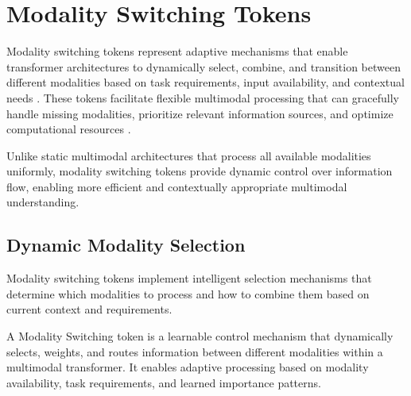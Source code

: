 
\section{Modality Switching Tokens}

Modality switching tokens represent adaptive mechanisms that enable transformer architectures to dynamically select, combine, and transition between different modalities based on task requirements, input availability, and contextual needs \citep{reed2022generalist, girdhar2023imagebind}. These tokens facilitate flexible multimodal processing that can gracefully handle missing modalities, prioritize relevant information sources, and optimize computational resources \citep{driess2023palm}.
\begin{comment}
Feedback: This is a good introduction. To make the concept more tangible, you could use an analogy: "If a standard multimodal model is like a panel of experts where each expert (vision, audio, text) always gets an equal say, a model with modality switching tokens is like a skilled project manager who can listen to all the experts but then dynamically decide which expert's opinion is most relevant for the current problem. Sometimes the visual expert is most important, sometimes it's the audio expert, and the switching token learns to make that decision on the fly."
\end{comment}

Unlike static multimodal architectures that process all available modalities uniformly, modality switching tokens provide dynamic control over information flow, enabling more efficient and contextually appropriate multimodal understanding.

\subsection{Dynamic Modality Selection}

Modality switching tokens implement intelligent selection mechanisms that determine which modalities to process and how to combine them based on current context and requirements.

\begin{definition}
A Modality Switching token is a learnable control mechanism that dynamically selects, weights, and routes information between different modalities within a multimodal transformer. It enables adaptive processing based on modality availability, task requirements, and learned importance patterns.
\end{definition}


